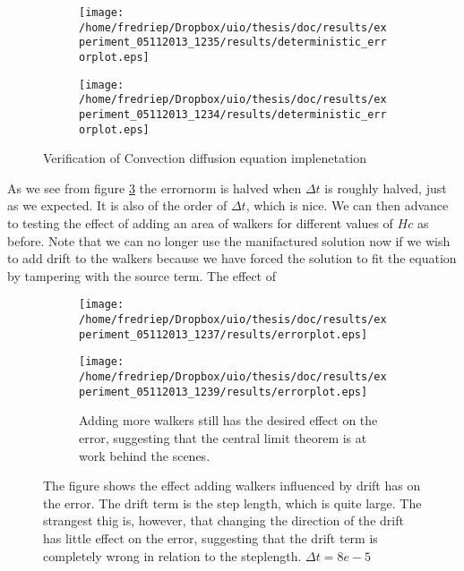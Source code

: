 \begin{figure}[H]
\centering
\begin{subfigure}[b]{0.48\textwidth}
\texttt{[image: /home/fredriep/Dropbox/uio/thesis/doc/results/experiment\_05112013\_1235/results/deterministic\_errorplot.eps]}
\caption{}
\label{Verification_convection_diffusion:single_dt}
\end{subfigure}
\begin{subfigure}[b]{0.48\textwidth}
\texttt{[image: /home/fredriep/Dropbox/uio/thesis/doc/results/experiment\_05112013\_1234/results/deterministic\_errorplot.eps]}
\caption{}
\label{Verification_convection_diffusion:double_dt}
\end{subfigure}
\caption[Verification of Convection diffusion equation implenetation]{Verification of Convection diffusion equation implenetation}
\label{Verification_convection_diffusion}
\end{figure}

As we see from figure \ref{Verification_convection_diffusion} the errornorm is halved when $\Delta t$ is roughly halved, just as we expected. It is also of the order of $\Delta t$, which is nice.  
We can then advance to testing the effect of adding an area of walkers for different values of $Hc$ as before. 
Note that we can no longer use the manifactured solution now if we wish to add drift to the walkers because we have forced the solution to fit the equation by tampering with the source term. 
The effect of
\begin{figure}[H]
\centering
\begin{subfigure}[b]{0.48\textwidth}
\texttt{[image: /home/fredriep/Dropbox/uio/thesis/doc/results/experiment\_05112013\_1237/results/errorplot.eps]}
\caption{}
\label{Errortest_convection_diffusion_walkers:few_walkers}
\end{subfigure}
\begin{subfigure}[b]{0.48\textwidth}
\texttt{[image: /home/fredriep/Dropbox/uio/thesis/doc/results/experiment\_05112013\_1239/results/errorplot.eps]}
\caption{Adding more walkers still has the desired effect on the error, suggesting that the central limit theorem is at work behind the scenes.}
\label{Errortest_convection_diffusion_walkers:more_walkers}
\end{subfigure}
\caption[Adding walkers influenced by drift]{The figure shows the effect adding walkers influenced by drift has on the error. 
The drift term is the step length, which is quite large. The strangest thig is, however, that changing the direction of the drift has little effect on the error, suggesting that the drift term is completely wrong in relation to the steplength. $\Delta t =8e-5$}
\label{Errortest_convection_diffusion_walkers}
\end{figure}




